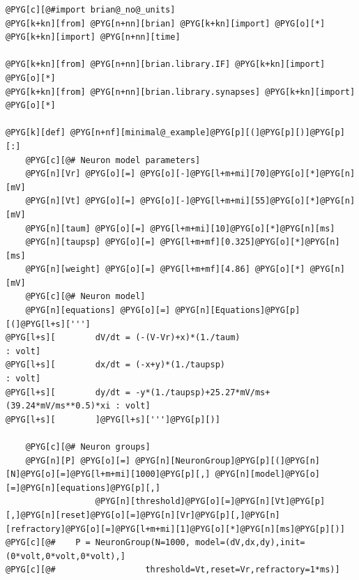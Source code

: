 \documentclass[letterpaper,10pt,english]{manual}
\begin{document}
\begin{Verbatim}[commandchars=@\[\]]
@PYG[c][@#import brian@_no@_units]
@PYG[k+kn][from] @PYG[n+nn][brian] @PYG[k+kn][import] @PYG[o][*]
@PYG[k+kn][import] @PYG[n+nn][time]

@PYG[k+kn][from] @PYG[n+nn][brian.library.IF] @PYG[k+kn][import] @PYG[o][*]
@PYG[k+kn][from] @PYG[n+nn][brian.library.synapses] @PYG[k+kn][import] @PYG[o][*]

@PYG[k][def] @PYG[n+nf][minimal@_example]@PYG[p][(]@PYG[p][)]@PYG[p][:]
    @PYG[c][@# Neuron model parameters]
    @PYG[n][Vr] @PYG[o][=] @PYG[o][-]@PYG[l+m+mi][70]@PYG[o][*]@PYG[n][mV]
    @PYG[n][Vt] @PYG[o][=] @PYG[o][-]@PYG[l+m+mi][55]@PYG[o][*]@PYG[n][mV]
    @PYG[n][taum] @PYG[o][=] @PYG[l+m+mi][10]@PYG[o][*]@PYG[n][ms]
    @PYG[n][taupsp] @PYG[o][=] @PYG[l+m+mf][0.325]@PYG[o][*]@PYG[n][ms]
    @PYG[n][weight] @PYG[o][=] @PYG[l+m+mf][4.86] @PYG[o][*] @PYG[n][mV]
    @PYG[c][@# Neuron model]
    @PYG[n][equations] @PYG[o][=] @PYG[n][Equations]@PYG[p][(]@PYG[l+s][''']
@PYG[l+s][        dV/dt = (-(V-Vr)+x)*(1./taum)                            : volt]
@PYG[l+s][        dx/dt = (-x+y)*(1./taupsp)                               : volt]
@PYG[l+s][        dy/dt = -y*(1./taupsp)+25.27*mV/ms+(39.24*mV/ms**0.5)*xi : volt]
@PYG[l+s][        ]@PYG[l+s][''']@PYG[p][)]

    @PYG[c][@# Neuron groups]
    @PYG[n][P] @PYG[o][=] @PYG[n][NeuronGroup]@PYG[p][(]@PYG[n][N]@PYG[o][=]@PYG[l+m+mi][1000]@PYG[p][,] @PYG[n][model]@PYG[o][=]@PYG[n][equations]@PYG[p][,]
                  @PYG[n][threshold]@PYG[o][=]@PYG[n][Vt]@PYG[p][,]@PYG[n][reset]@PYG[o][=]@PYG[n][Vr]@PYG[p][,]@PYG[n][refractory]@PYG[o][=]@PYG[l+m+mi][1]@PYG[o][*]@PYG[n][ms]@PYG[p][)]
@PYG[c][@#    P = NeuronGroup(N=1000, model=(dV,dx,dy),init=(0*volt,0*volt,0*volt),]
@PYG[c][@#                  threshold=Vt,reset=Vr,refractory=1*ms)]


\end{Verbatim}
\end{document}
